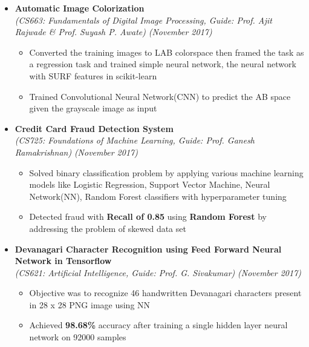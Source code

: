 \documentclass[a4paper,10pt]{article}
\newcommand{\isep}{-2 pt}
\begin{document}
\begin{itemize}
\item \textbf{Automatic Image Colorization} \\
    {\emph{(CS663: Fundamentals of Digital Image Processing, Guide: Prof. Ajit Rajwade \& Prof. Suyash P. Awate)}} \hfill {\emph{(November 2017)}}
    \\ [-0.6cm]
    \begin{itemize}\itemsep \isep
    \item Converted the training images to LAB colorspace then framed the task as a regression task and trained simple neural network, the neural network with SURF features in scikit-learn
    \item Trained Convolutional Neural Network(CNN) to predict the AB space given the grayscale image as input
\end{itemize}

\item \textbf{Credit Card Fraud Detection System}\\ {\emph{(CS725: Foundations of Machine Learning, Guide: Prof. Ganesh Ramakrishnan)}} \hfill {\emph{(November 2017)}}
\\[-0.6cm]
    \begin{itemize}\itemsep \isep
        \item Solved binary classification problem by applying various machine learning models like Logistic Regression, Support Vector Machine, Neural Network(NN), Random Forest classifiers with hyperparameter tuning
        \item Detected fraud with \textbf{Recall of 0.85} using \textbf{Random Forest} by addressing the problem of skewed data set 
    \end{itemize}

\pagebreak
\item \textbf{Devanagari Character Recognition using Feed Forward Neural Network in Tensorflow} \\ {\emph{(CS621: Artificial Intelligence, Guide: Prof. G. Sivakumar)}} \hfill {\emph{(November 2017)}}
    \\ [-0.6cm]
    \begin{itemize}\itemsep \isep
    \item Objective was to recognize 46 handwritten Devanagari characters present in 28 x 28 PNG image using NN
    \item Achieved \textbf{98.68\%} accuracy after training a single hidden layer neural network on 92000 samples
    \end{itemize}


\end{itemize}
\end{document}
